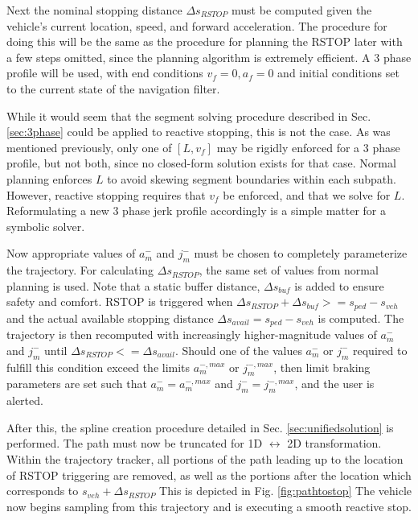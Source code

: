\documentclass[letterpaper, 10 pt, conference]{ieeeconf}  %
\begin{document}
Next the nominal stopping distance $\Delta s_{RSTOP}$ must be computed given the vehicle's current location, speed, and forward acceleration.
The procedure for doing this will be the same as the procedure for planning the RSTOP later with a few steps omitted, since the planning algorithm is extremely efficient.
A 3 phase profile will be used, with end conditions $v_f=0, a_f=0$ and initial conditions set to the current state of the navigation filter.

While it would seem that the segment solving procedure described in Sec. \ref{sec:3phase} could be applied to reactive stopping, this is not the case.
As was mentioned previously, only one of $[L, v_f]$ may be rigidly enforced for a 3 phase profile, but not both, since no closed-form solution exists for that case.
Normal planning enforces $L$ to avoid skewing segment boundaries within each subpath.
However, reactive stopping requires that $v_f$ be enforced, and that we solve for $L$.
Reformulating a new 3 phase jerk profile accordingly is a simple matter for a symbolic solver.

Now appropriate values of $a_m^-$ and $j_m^-$ must be chosen to completely parameterize the trajectory.
For calculating $\Delta s_{RSTOP}$, the same set of values from normal planning is used.
Note that a static buffer distance, $\Delta s_{buf}$ is added to ensure safety and comfort.
RSTOP is triggered when $\Delta s_{RSTOP} + \Delta s_{buf} >= s_{ped} - s_{veh}$ and the actual available stopping distance $\Delta s_{avail} = s_{ped} - s_{veh}$ is computed.
The trajectory is then recomputed with increasingly higher-magnitude values of $a_m^-$ and $j_m^-$ until $\Delta s_{RSTOP} <= \Delta s_{avail}$.
Should one of the values $a_m^-$ or $j_m^-$ required to fulfill this condition exceed the limits $a_m^{-,max}$ or $j_m^{-,max}$, then limit braking parameters are set such that $a_m^-=a_m^{-,max}$ and $j_m^-=j_m^{-,max}$, and the user is alerted.

After this, the spline creation procedure detailed in Sec. \ref{sec:unifiedsolution} is performed.
The path must now be truncated for 1D $\leftrightarrow$ 2D transformation.
Within the trajectory tracker, all portions of the path leading up to the location of RSTOP triggering are removed, as well as the portions after the location which corresponds to $s_{veh} + \Delta s_{RSTOP}$
This is depicted in Fig. \ref{fig:pathtostop}
The vehicle now begins sampling from this trajectory and is executing a smooth reactive stop.
\end{document}

